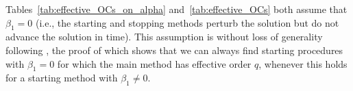 Tables~\ref{tab:effective_OCs_on_alpha} and~\ref{tab:effective_OCs}
both assume that $\beta_1=0$ (i.e., the starting and stopping methods
perturb the solution but do not advance the solution in time).  This
assumption is without loss of generality following \cite[Lemma
389A]{Butcher2008_book}, the proof of which shows that we can always find 
starting procedures with $\beta_1 = 0$ for which the main method has 
effective order $q$, whenever this holds for a starting method with 
$\beta_1 \neq 0$.




